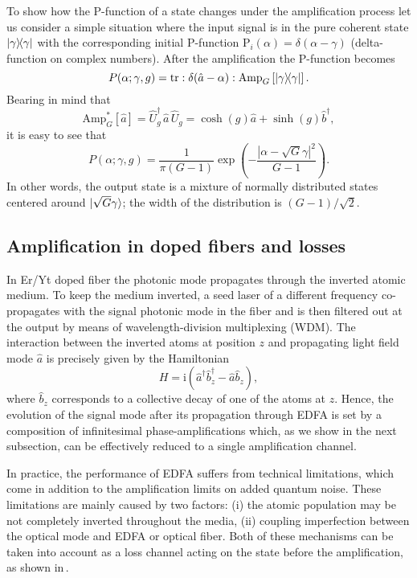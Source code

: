 \documentclass[a4paper]{article}
\newcommand{\prjct}[1]{\mathinner{|{#1}\rangle}\!\!\mathinner{\langle{#1}|}}
\newcommand{\ii}{\mathrm{i}}
\newcommand{\tr}{\text{tr}}
\renewcommand{\t}[1]{\mathrm{#1}}
\newcommand{\be}{\begin{equation}}
\newcommand{\ee}{\end{equation}}
\begin{document}
To show how the P-function of a state changes under the amplification process let us consider a simple situation where the input signal is in the pure coherent state $\prjct{\gamma}$ with the corresponding initial P-function $\t{P}_i(\alpha)= \delta(\alpha-\gamma)$ (delta-function on complex numbers).
After the amplification the P-function becomes
\be
P(\alpha;\gamma,g) = \tr  :\delta(\hat a-\alpha): \t{Amp}_{G}\left[\prjct{\gamma} \right].
\ee
Bearing in mind that
\be\label{eq: canonical amp}
\t{Amp}^*_{G}[\hat{a}]=\hat{U}_g^\dag\,  \hat{a} \, \hat{U}_g = \cosh(g) \hat{a} + \sinh(g) \hat{b}^\dag,
\ee
it is easy to see that
\be\boxed{
P(\alpha; \gamma, g) = \frac{1}{\pi (G-1)} \exp\left(-\frac{|\alpha- \sqrt{G} \gamma|^2}{G-1}\right).}
\label{P-function}
\ee
In other words, the output state is a mixture of normally distributed states centered around $\ket{\sqrt{G} \gamma}$; the width of the distribution is $(G-1)/\sqrt{2}$.

\subsection{Amplification in doped fibers and losses}

In Er/Yt doped fiber the photonic mode propagates through the inverted atomic medium. 
To keep the medium inverted, a seed laser of a different frequency co-propagates with the signal photonic mode in the fiber and is then filtered out at the output by means of wavelength-division multiplexing (WDM).
The interaction between the inverted atoms at position $z$ and propagating light field mode $\hat{a}$ is precisely given by the Hamiltonian
\be
H = \ii (\hat{a}^\dag \hat{b}_z^\dag - \hat{a} \hat{b}_z),
\ee
where $\hat b_z$ corresponds to a collective decay  of one of the atoms at $z$. 
Hence, the evolution of the signal mode after its propagation through EDFA is set by a composition of infinitesimal phase-amplifications which, as we show in the next subsection, can be effectively reduced to a single amplification channel.

In practice, the performance of EDFA suffers from technical limitations, which come in addition to the amplification limits on added quantum noise. 
These limitations are mainly caused by two factors: (i) the atomic population may be not completely inverted throughout the media, (ii) coupling imperfection between the optical mode and EDFA or optical fiber.
Both of these mechanisms can be taken into account as a loss channel acting on the state before the amplification, as shown in\,\cite{Sanguinetti}.
\end{document}
